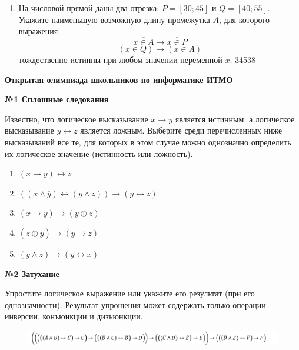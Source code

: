 \begin{spacing}{1.1}
\begin{enumerate}
            \item На числовой прямой даны два отрезка: $P = [30; 45]$ и $Q = [40; 55]$.
            Укажите наименьшую возможную длину промежутка $A$, для которого выражения
            \[ \overline{x \in A} \rightarrow \overline{x \in P} \]
            \[ (x \in Q) \rightarrow (x \in A) \]
            тождественно истинны при любом значении переменной $x$. 34538

        \end{enumerate}
    \end{spacing}

    \newpage
    \begin{center}
        \textbf{Открытая олимпиада школьников по информатике ИТМО}
    \end{center}

    \begin{center}
        \textbf{№1 Сплошные следования}
    \end{center}

    Известно, что логическое высказывание $x \rightarrow y$ является истинным, а логическое высказывание $y \leftrightarrow z$ является ложным.
    Выберите среди перечисленных ниже высказываний все те, для которых в этом случае можно однозначно определить их
    логическое значение (истинность или ложность).
    \begin{enumerate}
        \item $(x \rightarrow y) \leftrightarrow z$
        \item $((x \wedge \overline y) \leftrightarrow (y \wedge z)) \rightarrow (y \leftrightarrow z)$
        \item $(x \rightarrow y) \rightarrow (y \oplus z)$
        \item $(\overline{z \oplus y}) \rightarrow (y \rightarrow z)$
        \item $(\overline y \wedge z) \rightarrow (y \leftrightarrow \overline x)$
    \end{enumerate}

    \begin{center}
        \textbf{№2 Затухание}
    \end{center}

    Упростите логическое выражение или укажите его результат (при его однозначности). Результат упрощения может
    содержать только операции инверсии, конъюнкции и дизъюнкции.

    \begin{figure}[h]
        \centering
        \includegraphics[width=1.2  \linewidth]{images/im1}
    \end{figure}


